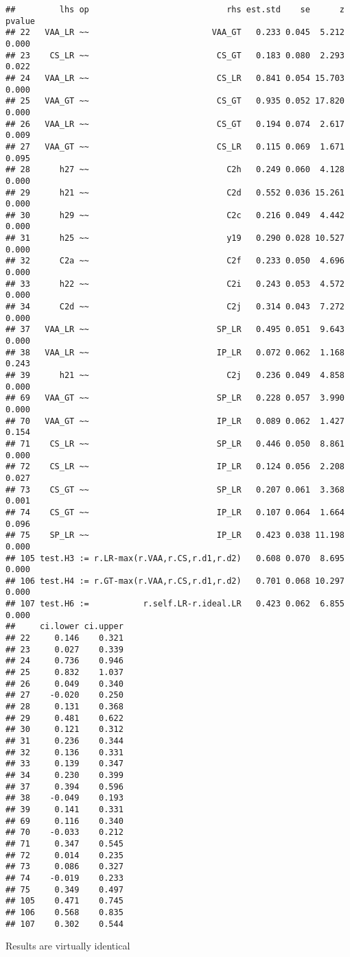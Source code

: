 \documentclass[
]{article}
\begin{document}
\begin{verbatim}
##         lhs op                            rhs est.std    se      z pvalue
## 22   VAA_LR ~~                         VAA_GT   0.233 0.045  5.212  0.000
## 23    CS_LR ~~                          CS_GT   0.183 0.080  2.293  0.022
## 24   VAA_LR ~~                          CS_LR   0.841 0.054 15.703  0.000
## 25   VAA_GT ~~                          CS_GT   0.935 0.052 17.820  0.000
## 26   VAA_LR ~~                          CS_GT   0.194 0.074  2.617  0.009
## 27   VAA_GT ~~                          CS_LR   0.115 0.069  1.671  0.095
## 28      h27 ~~                            C2h   0.249 0.060  4.128  0.000
## 29      h21 ~~                            C2d   0.552 0.036 15.261  0.000
## 30      h29 ~~                            C2c   0.216 0.049  4.442  0.000
## 31      h25 ~~                            y19   0.290 0.028 10.527  0.000
## 32      C2a ~~                            C2f   0.233 0.050  4.696  0.000
## 33      h22 ~~                            C2i   0.243 0.053  4.572  0.000
## 34      C2d ~~                            C2j   0.314 0.043  7.272  0.000
## 37   VAA_LR ~~                          SP_LR   0.495 0.051  9.643  0.000
## 38   VAA_LR ~~                          IP_LR   0.072 0.062  1.168  0.243
## 39      h21 ~~                            C2j   0.236 0.049  4.858  0.000
## 69   VAA_GT ~~                          SP_LR   0.228 0.057  3.990  0.000
## 70   VAA_GT ~~                          IP_LR   0.089 0.062  1.427  0.154
## 71    CS_LR ~~                          SP_LR   0.446 0.050  8.861  0.000
## 72    CS_LR ~~                          IP_LR   0.124 0.056  2.208  0.027
## 73    CS_GT ~~                          SP_LR   0.207 0.061  3.368  0.001
## 74    CS_GT ~~                          IP_LR   0.107 0.064  1.664  0.096
## 75    SP_LR ~~                          IP_LR   0.423 0.038 11.198  0.000
## 105 test.H3 := r.LR-max(r.VAA,r.CS,r.d1,r.d2)   0.608 0.070  8.695  0.000
## 106 test.H4 := r.GT-max(r.VAA,r.CS,r.d1,r.d2)   0.701 0.068 10.297  0.000
## 107 test.H6 :=           r.self.LR-r.ideal.LR   0.423 0.062  6.855  0.000
##     ci.lower ci.upper
## 22     0.146    0.321
## 23     0.027    0.339
## 24     0.736    0.946
## 25     0.832    1.037
## 26     0.049    0.340
## 27    -0.020    0.250
## 28     0.131    0.368
## 29     0.481    0.622
## 30     0.121    0.312
## 31     0.236    0.344
## 32     0.136    0.331
## 33     0.139    0.347
## 34     0.230    0.399
## 37     0.394    0.596
## 38    -0.049    0.193
## 39     0.141    0.331
## 69     0.116    0.340
## 70    -0.033    0.212
## 71     0.347    0.545
## 72     0.014    0.235
## 73     0.086    0.327
## 74    -0.019    0.233
## 75     0.349    0.497
## 105    0.471    0.745
## 106    0.568    0.835
## 107    0.302    0.544
\end{verbatim}

Results are virtually identical
\end{document}
